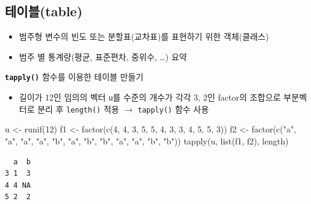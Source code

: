 \documentclass[
  11pt,
]{krantz}
\newenvironment{Shaded}{\begin{snugshade}}{\end{snugshade}}
\newcommand{\DecValTok}[1]{\textcolor[rgb]{0.06,0.06,0.06}{#1}}
\newcommand{\FunctionTok}[1]{\textcolor[rgb]{0,0,0}{#1}}
\newcommand{\NormalTok}[1]{#1}
\newcommand{\OtherTok}[1]{\textcolor[rgb]{0.37,0.37,0.37}{#1}}
\newcommand{\StringTok}[1]{\textcolor[rgb]{0.5,0.5,0.5}{#1}}
\providecommand{\tightlist}{%
  \setlength{\itemsep}{0pt}\setlength{\parskip}{0pt}}
\begin{document}
\normalsize

\hypertarget{table}{%
\subsection{테이블(table)}\label{table}}

\begin{itemize}
\tightlist
\item
  범주형 변수의 빈도 또는 분할표(교차표)를 표현하기 위한 객체(클래스)
\item
  범주 별 통계량(평균, 표준편차, 중위수, \ldots) 요약
\end{itemize}

\textbf{\texttt{tapply()}} 함수를 이용한 테이블 만들기

\begin{itemize}
\tightlist
\item
  길이가 12인 임의의 벡터 \texttt{u}를 수준의 개수가 각각 3, 2인 factor의 조합으로 부분벡터로 분리 후 \texttt{length()} 적용 \(\rightarrow\) \texttt{tapply()} 함수 사용
\end{itemize}

\footnotesize

\begin{Shaded}
\begin{Highlighting}[]
\NormalTok{u }\OtherTok{\textless{}{-}} \FunctionTok{runif}\NormalTok{(}\DecValTok{12}\NormalTok{)}
\NormalTok{f1 }\OtherTok{\textless{}{-}} \FunctionTok{factor}\NormalTok{(}\FunctionTok{c}\NormalTok{(}\DecValTok{4}\NormalTok{, }\DecValTok{4}\NormalTok{, }\DecValTok{3}\NormalTok{, }\DecValTok{5}\NormalTok{, }\DecValTok{5}\NormalTok{, }\DecValTok{4}\NormalTok{, }
               \DecValTok{3}\NormalTok{, }\DecValTok{3}\NormalTok{, }\DecValTok{4}\NormalTok{, }\DecValTok{5}\NormalTok{, }\DecValTok{5}\NormalTok{, }\DecValTok{3}\NormalTok{))}
\NormalTok{f2 }\OtherTok{\textless{}{-}} \FunctionTok{factor}\NormalTok{(}\FunctionTok{c}\NormalTok{(}\StringTok{"a"}\NormalTok{, }\StringTok{"a"}\NormalTok{, }\StringTok{"a"}\NormalTok{, }\StringTok{"a"}\NormalTok{, }\StringTok{"b"}\NormalTok{, }\StringTok{"a"}\NormalTok{, }
               \StringTok{"b"}\NormalTok{, }\StringTok{"b"}\NormalTok{, }\StringTok{"a"}\NormalTok{, }\StringTok{"a"}\NormalTok{, }\StringTok{"b"}\NormalTok{, }\StringTok{"b"}\NormalTok{))}
\FunctionTok{tapply}\NormalTok{(u, }\FunctionTok{list}\NormalTok{(f1, f2), length)}
\end{Highlighting}
\end{Shaded}

\begin{verbatim}
  a  b
3 1  3
4 4 NA
5 2  2
\end{verbatim}
\end{document}
